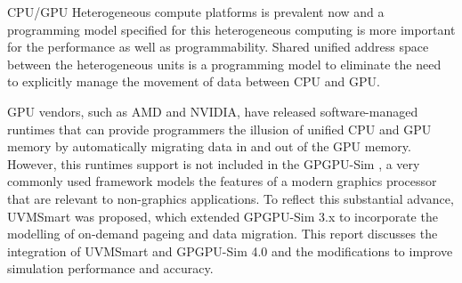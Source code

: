 CPU/GPU Heterogeneous compute platforms is prevalent now and a programming model
specified for this heterogeneous computing is more important for the 
performance as well as programmability. Shared unified address space between the 
heterogeneous units is a programming model to eliminate the need to explicitly manage 
the movement of data between CPU and GPU.

GPU vendors, such as AMD and NVIDIA, have released software-managed runtimes that can provide programmers the illusion of unified CPU and GPU memory by automatically migrating data in and out of the GPU memory. However, this runtimes support is not included in the GPGPU-Sim \cite{gpgpu_sim}, a very commonly used framework models the features of a modern graphics processor that are relevant to non-graphics applications. To reflect this substantial advance, UVMSmart \cite{9139797} was proposed, which extended GPGPU-Sim 3.x to incorporate the modelling of on-demand pageing and data migration. This report 
discusses the integration of UVMSmart and GPGPU-Sim 4.0 and the modifications to 
improve simulation performance and accuracy.